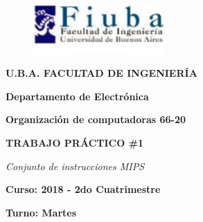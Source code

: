 \documentclass[11pt,a4paper]{article}
\author{cyn}
\begin{document}
\begin{titlepage}
\begin{center}
\vspace*{-1in}
\begin{figure}[htb]
\begin{flushleft}
\includegraphics[width=5cm]{./logo}
\end{flushleft}
\end{figure}
\begin{LARGE}
\textbf{U.B.A. FACULTAD DE INGENIERÍA}\\
\end{LARGE}
\vspace*{0.15in}
\begin{LARGE}
\textbf{Departamento de Electrónica}\\
\end{LARGE}
\vspace*{0.2in}
\begin{LARGE}
\textbf{Organización de computadoras 66-20}\\
\end{LARGE}
\vspace*{0.2in}
\begin{Large}
\textbf{TRABAJO PRÁCTICO \#1}\\
\end{Large}
\vspace*{0.2in}
\begin{LARGE}
\textit{Conjunto de instrucciones MIPS }\\
\end{LARGE}
\vspace*{0.2in}
\begin{Large}
\raggedright\textbf{Curso: 2018 - 2do Cuatrimestre}\\
\end{Large}
\vspace*{0.1in}
\begin{Large}
\raggedright\textbf{Turno: Martes}\\
\end{Large}
\vspace*{0.1in}


\end{center}
\end{titlepage}
\end{document}
